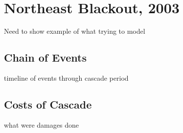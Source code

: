 
\section{Northeast Blackout, 2003}

Need to show example of what trying to model

\subsection{Chain of Events}

timeline of events through cascade period

\subsection{Costs of Cascade}

what were damages done
